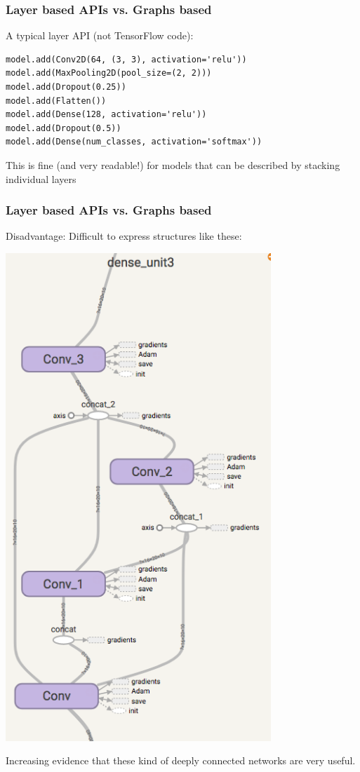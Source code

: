 \documentclass{beamer}
\begin{document}
\begin{frame}[fragile]
  \frametitle{Layer based APIs vs. Graphs based}
  
A typical  layer API (not TensorFlow code):
  
  \begin{lstlisting}
model.add(Conv2D(64, (3, 3), activation='relu'))
model.add(MaxPooling2D(pool_size=(2, 2)))
model.add(Dropout(0.25))
model.add(Flatten())
model.add(Dense(128, activation='relu'))
model.add(Dropout(0.5))
model.add(Dense(num_classes, activation='softmax'))
\end{lstlisting}

This is fine (and very readable!) for models that can be described by stacking individual layers
  
\end{frame} 

\begin{frame}[fragile]
  \frametitle{Layer based APIs vs. Graphs based}
  
Disadvantage: Difficult to express structures like these:
  
    \includegraphics[angle=-90,width=0.75\textwidth]{graph_example}

Increasing evidence that these kind of deeply connected networks are very useful.
  
\end{frame} 
\end{document}
